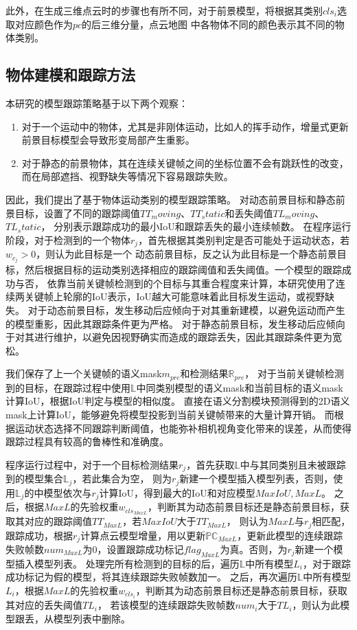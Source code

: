 此外，在生成三维点云时的步骤也有所不同，对于前景模型，将根据其类别$cls_{i}$选取对应颜色作为$pc$的后三维分量，点云地图
中各物体不同的颜色表示其不同的物体类别。

\subsection{物体建模和跟踪方法}

本研究的模型跟踪策略基于以下两个观察：
{
\setlist[enumerate]{}%
\begin{enumerate}[nosep]
    \item 对于一个运动中的物体，尤其是非刚体运动，比如人的挥手动作，增量式更新前景目标模型会导致形变局部产生重影。
    \item 对于静态的前景物体，其在连续关键帧之间的坐标位置不会有跳跃性的改变，而在局部遮挡、视野缺失等情况下容易跟踪失败。
\end{enumerate}
}
因此，我们提出了基于物体运动类别的模型跟踪策略。
对动态前景目标和静态前景目标，设置了不同的跟踪阈值$TT_moving$、$TT_static$和丢失阈值$TL_moving$、$TL_static$，
分别表示跟踪成功的最小IoU和跟踪丢失的最小连续帧数。
在程序运行阶段，对于检测到的一个物体$r_{j}$，首先根据其类别判定是否可能处于运动状态，若$w_{c_{j}}>0$，则认为此目标是一个
动态前景目标，反之认为此目标是一个静态前景目标，然后根据目标的运动类别选择相应的跟踪阈值和丢失阈值。一个模型的跟踪成功与否，
依靠当前关键帧检测到的个目标与其重合程度来计算，本研究使用了连续两关键帧上轮廓的IoU表示，IoU越大可能意味着此目标发生运动，或视野缺失。
对于动态前景目标，发生移动后应倾向于对其重新建模，以避免运动而产生的模型重影，因此其跟踪条件更为严格。
对于静态前景目标，发生移动后应倾向于对其进行维护，以避免因视野确实而造成的跟踪丢失，因此其跟踪条件更为宽松。

我们保存了上一个关键帧的语义mask$m_{pre}$和检测结果$\mathbb{R}_{pre}$，
对于当前关键帧检测到的目标，在跟踪过程中使用$\mathbb{L}$中同类别模型的语义mask和当前目标的语义mask计算IoU，根据IoU判定与模型的相似度。
直接在语义分割模块预测得到的2D语义mask上计算IoU，能够避免将模型投影到当前关键帧带来的大量计算开销。
而根据运动状态选择不同跟踪判断阈值，也能弥补相机视角变化带来的误差，从而使得跟踪过程具有较高的鲁棒性和准确度。

程序运行过程中，对于一个目标检测结果$r_{j}$，首先获取$\mathbb{L}$中与其同类别且未被跟踪到的模型集合$\mathbb{L}_{j}$，若此集合为空，
则为$r_{j}$新建一个模型插入模型列表，否则，使用$\mathbb{L}_{j}$的中模型依次与$r_{j}$计算IoU，得到最大的IoU和对应模型$MaxIoU, MaxL$。
之后，根据$MaxL$的先验权重$w_{cls_{MaxL}}$，判断其为动态前景目标还是静态前景目标，获取其对应的跟踪阈值$TT_{MaxL}$，若$MaxIoU$大于$TT_{MaxL}$，
则认为$MaxL$与$r_{j}$相匹配，跟踪成功，根据$r_{j}$计算点云模型增量，用以更新$\mathbb{PC}_{MaxL}$，更新此模型的连续跟踪失败帧数$num_{MaxL}$为0，设置跟踪成功标记$flag_{MaxL}$为真。否则，为$r_{j}$新建一个模型插入模型列表。
处理完所有检测到的目标的后，遍历$\mathbb{L}$中所有模型$L_{i}$，对于跟踪成功标记为假的模型，将其连续跟踪失败帧数加一。
之后，再次遍历$\mathbb{L}$中所有模型$L_{i}$，根据$MaxL$的先验权重$w_{cls_{i}}$，判断其为动态前景目标还是静态前景目标，获取其对应的丢失阈值$TL_{i}$，
若该模型的连续跟踪失败帧数$num_{i}$大于$TL_{i}$，则认为此模型跟丢，从模型列表中删除。

